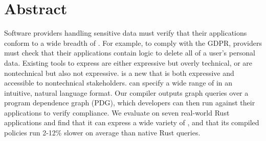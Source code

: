 \chapter*{Abstract}

%
Software providers handling sensitive data must verify that their applications conform to a wide breadth of \policies.
%
For example, to comply with the GDPR, providers must check that their applications contain logic to delete all of a user's personal data.
% 
Existing tools to express \policies{} are either expressive but overly technical, or are nontechnical but also not expressive.
%
\syslang{} is a new \policylang{} that is both expressive and accessible to nontechnical stakeholders.
%
\syslang{} can specify a wide range of \policies{} in an intuitive, natural language format.
%
Our \syslang{} compiler outputs graph queries over a program dependence graph (PDG),
which developers can then run against their applications to verify compliance.
%
We evaluate \syslang{} on seven real-world Rust applications and find that it can
express a wide variety of \policies{}, and that its compiled policies run 2-12\% slower on average than native Rust queries.
